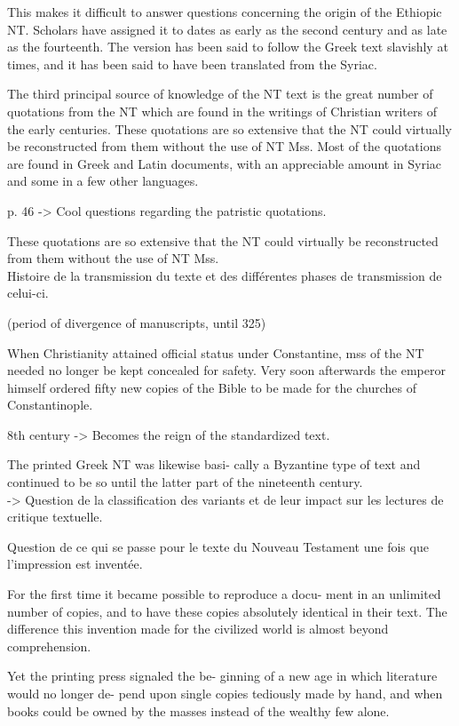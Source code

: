 This makes it difficult to answer
questions concerning the origin of the Ethiopic NT. Scholars
have assigned it to dates as early as the second century and as
late as the fourteenth. The version has been said to follow the
Greek text slavishly at times, and it has been said to have been
translated from the Syriac.

The third principal source of knowledge of the NT text is
the great number of quotations from the NT which are found
in the writings of Christian writers of the early centuries. These
quotations are so extensive that the NT could virtually be
reconstructed from them without the use of NT Mss. Most
of the quotations are found in Greek and Latin documents,
with an appreciable amount in Syriac and some in a few other
languages.

p. 46 -> Cool questions regarding the patristic quotations.

These
quotations are so extensive that the NT could virtually be
reconstructed from them without the use of NT Mss. \\

Histoire de la transmission du texte et des différentes phases de transmission de celui-ci.

(period of divergence of manuscripts, until 325)

When Christianity attained official status under Constantine,
mss of the NT needed no longer be kept concealed for safety. Very
soon afterwards the emperor himself ordered fifty new copies of
the Bible to be made for the churches of Constantinople.

8th century -> Becomes the reign of the standardized text.

The printed Greek NT was likewise basi-
cally a Byzantine type of text and continued to be so until the
latter part of the nineteenth century.\\


-> Question de la classification des variants et de leur impact sur les lectures de critique textuelle.

Question de ce qui se passe pour le texte du Nouveau Testament une fois que l'impression est inventée.

For the first time it became possible to reproduce a docu-
ment in an unlimited number of copies, and to have these copies
absolutely identical in their text. The difference this invention
made for the civilized world is almost beyond comprehension.


Yet the printing press signaled the be-
ginning of a new age in which literature would no longer de-
pend upon single copies tediously made by hand, and when
books could be owned by the masses instead of the wealthy few
alone.

